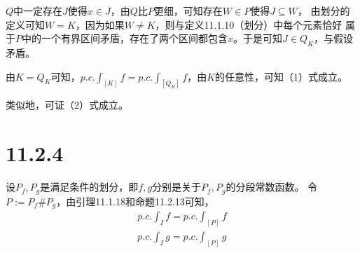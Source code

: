 \documentclass{article}
\begin{document}
$Q$中一定存在$J$使得$x \in J$，由$Q$比$P$更细，可知存在$W \in P$使得$J \subseteq W$，
由划分的定义可知$W = K$，因为如果$W \neq K$，则与定义11.1.10（划分）中每个元素恰好
属于$P$中的一个有界区间矛盾，存在了两个区间都包含$x$。于是可知$J \in Q_K$，与假设矛盾。

由$K = Q_K$可知，$p.c.\int_{[K]} f = p.c.\int_{[Q_K]}f$，由$K$的任意性，可知（1）式成立。

类似地，可证（2）式成立。

\section*{11.2.4}

设$P_f,P_g$是满足条件的划分，即$f,g$分别是关于$P_f,P_g$的分段常数函数。
令$P := P_f \# P_g$，由引理11.1.18和命题11.2.13可知，
\begin{align*}
  p.c.\int_{I} f = p.c.\int_{[P]}f \\
  p.c.\int_{I} g = p.c.\int_{[P]}g
\end{align*}
\end{document}
